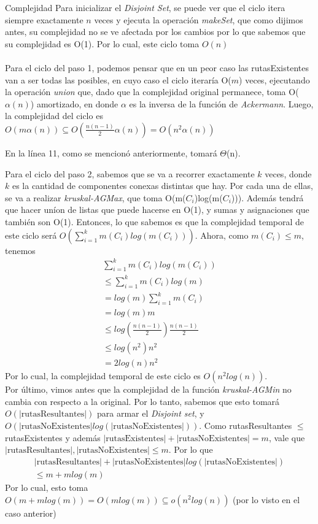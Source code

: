 \documentclass[a4paper]{article}
\begin{document}
\begin{subsection}{Complejidad}
Para inicializar el \textit{Disjoint Set}, se puede ver que el ciclo itera siempre exactamente $n$ veces y ejecuta la operaci\'{o}n \textit{makeSet}, que como dijimos antes, su complejidad no se ve afectada por los cambios por lo que sabemos que su complejidad es O(1). Por lo cual, este ciclo toma $O(n)$ \\ \\
Para el ciclo del paso 1, podemos pensar que en un peor caso las rutasExistentes van a ser todas las posibles, en cuyo caso el ciclo iterar\'{i}a O($m$) veces, ejecutando la operaci\'{o}n \textit{union} que, dado que la complejidad original permanece, toma O($\alpha(n)$) amortizado, en donde $\alpha$ es la inversa de la funci\'{o}n de \textit{Ackermann}. Luego, la complejidad del ciclo es $O(m\alpha(n))\subseteq O(\frac{n(n-1)}{2}\alpha(n))=O(n^2\alpha(n))$ 

En la l\'{i}nea 11, como se mencion\'{o} anteriormente, tomar\'{a} $\Theta$(n). 

Para el ciclo del paso 2, sabemos que se va a recorrer exactamente $k$ veces, donde $k$ es la cantidad de componentes conexas distintas que hay. Por cada una de ellas, se va a realizar \textit{kruskal-AGMax}, que toma O(m($C_i$)log(m($C_i$))). Adem\'{a}s tendr\'{a} que hacer un\'{i}on de listas que puede hacerse en O(1), y sumas y asignaciones que tambi\'{e}n son O(1). Entonces, lo que sabemos es que la complejidad temporal de este ciclo ser\'{a} $O(\sum\limits_{i=1}^k m(C_i)log(m(C_i)))$. Ahora, como $m(C_i) \leq m$, tenemos  \begin{align*}
\sum\limits_{i=1}^k m(C_i)log(m(C_i)) \\ 
\leq \sum\limits_{i=1}^k m(C_i)log(m) \\ 
= log(m)\sum\limits_{i=1}^k m(C_i) \\
= log(m)m \\
\leq log(\frac{n(n-1)}{2})\frac{n(n-1)}{2} \\
\leq log(n^2)n^2 \\
= 2log(n)n^2
\end{align*}
Por lo cual, la complejidad temporal de este ciclo es $O(n^2log(n))$. \\ 

Por \'{u}ltimo, vimos antes que la complejidad de la funci\'{o}n \textit{kruskal-AGMin} no cambia con respecto a la original. Por lo tanto, sabemos que esto tomar\'{a} $O(|\text{rutasResultantes}|)$ para armar el \textit{Disjoint set}, y $O(|\text{rutasNoExistentes}|log(|\text{rutasNoExistentes}|))$. Como rutasResultantes $\leq$ rutasExistentes y adem\'{a}s $|\text{rutasExistentes}|+|\text{rutasNoExistentes}|=m$, vale que $|\text{rutasResultantes}|, |\text{rutasNoExistentes}| \leq m$. Por lo que 
\begin{align*}
	|\text{rutasResultantes}| + |\text{rutasNoExistentes}|log(|\text{rutasNoExistentes}|) \\
    \leq m + m log(m)
\end{align*}
Por lo cual, esto toma $O(m+mlog(m)) = O(m log (m)) \subseteq o(n^2log(n))$ (por lo visto en el caso anterior) \\ 


\end{subsection}
\end{document}
